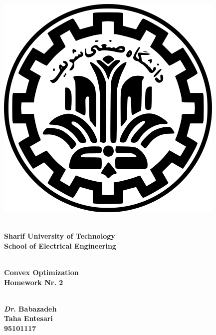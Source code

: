\documentclass[a4paper]{article}
\begin{document}
\begin{center}
	\vspace{2cm}
	\includegraphics[scale=.35]{logo1.png}\\
	\vspace{0.5cm}
	\begin{Large}
	\textbf{
	\\Sharif University of Technology
	\vspace{0.5cm}
	\\School of Electrical Engineering
	}
	\end{Large}
	\vspace{2cm}
	\begin{huge}
	\textbf{
	\\Convex Optimization
	\vspace{0.75cm}
‍
	\\Homework Nr. 2
	}
	\end{huge}
	\vspace{2cm}
	\begin{Large}
	\textbf{
	\\\textit{Dr}. Babazadeh
	\vspace{2cm}
	\\Taha Entesari
	\vspace{0.75cm}
	\\95101117
	}
	\end{Large}
	
\end{center}
\end{document}
